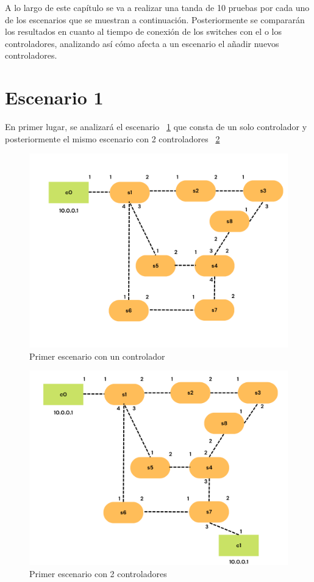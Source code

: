\documentclass[a4paper, 12pt]{book}
\begin{document}
 	A lo largo de este capítulo se va a realizar una tanda de 10 pruebas por cada uno de los escenarios que se muestran a continuación. Posteriormente se compararán los resultados en cuanto al tiempo de conexión de los switches con el o los controladores, analizando así cómo afecta a un escenario el añadir nuevos controladores.
 	
 	\section{Escenario 1}
 	En primer lugar, se analizará el escenario ~\ref{figura:escenario1-1c} que consta de un solo controlador y posteriormente el mismo escenario con 2 controladores ~\ref{figura:escenario1-2c}
 	
 	\begin{figure}[H]
 		\centering
 		\includegraphics[width=16cm, keepaspectratio]{img/escenario1-1}
 		\caption{Primer escenario con un controlador}
 		\label{figura:escenario1-1c}
 	\end{figure}
 	
 	\begin{figure}[H]
 		\centering
 		\includegraphics[width=16cm, keepaspectratio]{img/escenario1-2}
 		\caption{Primer escenario con 2 controladores}
 		\label{figura:escenario1-2c}
 	\end{figure}
 	
\end{document}

